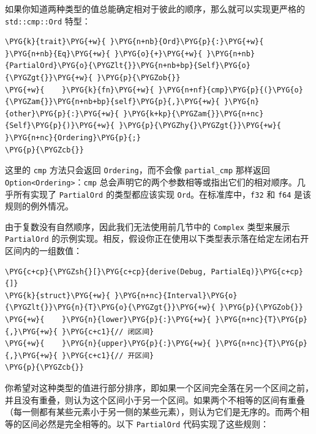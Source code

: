 如果你知道两种类型的值总能确定相对于彼此的顺序，那么就可以实现更严格的 \texttt{std::cmp::Ord} 特型：

\begin{Verbatim}[commandchars=\\\{\},breaklines=true,breakanywhere=true,fontsize=\codefont,xleftmargin=17bp]
\PYG{k}{trait}\PYG{+w}{ }\PYG{n+nb}{Ord}\PYG{p}{:}\PYG{+w}{ }\PYG{n+nb}{Eq}\PYG{+w}{ }\PYG{o}{+}\PYG{+w}{ }\PYG{n+nb}{PartialOrd}\PYG{o}{\PYGZlt{}}\PYG{n+nb+bp}{Self}\PYG{o}{\PYGZgt{}}\PYG{+w}{ }\PYG{p}{\PYGZob{}}
\PYG{+w}{    }\PYG{k}{fn}\PYG{+w}{ }\PYG{n+nf}{cmp}\PYG{p}{(}\PYG{o}{\PYGZam{}}\PYG{n+nb+bp}{self}\PYG{p}{,}\PYG{+w}{ }\PYG{n}{other}\PYG{p}{:}\PYG{+w}{ }\PYG{k+kp}{\PYGZam{}}\PYG{n+nc}{Self}\PYG{p}{)}\PYG{+w}{ }\PYG{p}{\PYGZhy{}\PYGZgt{}}\PYG{+w}{ }\PYG{n+nc}{Ordering}\PYG{p}{;}
\PYG{p}{\PYGZcb{}}
\end{Verbatim}

这里的 \texttt{cmp} 方法只会返回 \texttt{Ordering}，而不会像 \texttt{partial\_cmp} 那样返回 \texttt{Option<Ordering>}：\texttt{cmp} 总会声明它的两个参数相等或指出它们的相对顺序。几乎所有实现了 \texttt{PartialOrd} 的类型都应该实现 \texttt{Ord}。在标准库中，\texttt{f32} 和 \texttt{f64} 是该规则的例外情况。

由于复数没有自然顺序，因此我们无法使用前几节中的 \texttt{Complex} 类型来展示 \texttt{PartialOrd} 的示例实现。相反，假设你正在使用以下类型表示落在给定左闭右开区间内的一组数值：

\begin{Verbatim}[commandchars=\\\{\},breaklines=true,breakanywhere=true,fontsize=\codefont,xleftmargin=17bp]
\PYG{c+cp}{\PYGZsh{}[}\PYG{c+cp}{derive(Debug, PartialEq)}\PYG{c+cp}{]}
\PYG{k}{struct}\PYG{+w}{ }\PYG{n+nc}{Interval}\PYG{o}{\PYGZlt{}}\PYG{n}{T}\PYG{o}{\PYGZgt{}}\PYG{+w}{ }\PYG{p}{\PYGZob{}}
\PYG{+w}{    }\PYG{n}{lower}\PYG{p}{:}\PYG{+w}{ }\PYG{n+nc}{T}\PYG{p}{,}\PYG{+w}{ }\PYG{c+c1}{// 闭区间}
\PYG{+w}{    }\PYG{n}{upper}\PYG{p}{:}\PYG{+w}{ }\PYG{n+nc}{T}\PYG{p}{,}\PYG{+w}{ }\PYG{c+c1}{// 开区间}
\PYG{p}{\PYGZcb{}}
\end{Verbatim}

你希望对这种类型的值进行部分排序，即如果一个区间完全落在另一个区间之前，并且没有重叠，则认为这个区间小于另一个区间。如果两个不相等的区间有重叠（每一侧都有某些元素小于另一侧的某些元素），则认为它们是无序的。而两个相等的区间必然是完全相等的。以下 \texttt{PartialOrd} 代码实现了这些规则：

